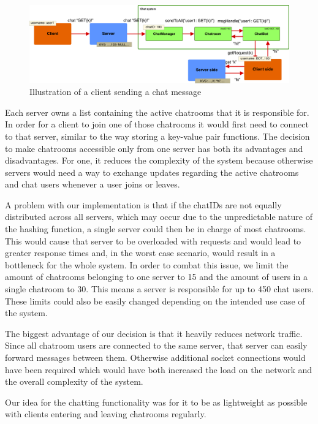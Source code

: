 \begin{figure}[h]
	\centering
	\includegraphics[width=\linewidth]{figures/chatsystem.png}
	\caption{Illustration of a client sending a chat message}
	\label{fig:chatsystem}
\end{figure}

Each server owns a list containing the active chatrooms that it is responsible for. In order for a client to join one of those chatrooms it would first need to connect to that server, similar to the way storing a key-value pair functions. The decision to make chatrooms accessible only from one server has both its advantages and disadvantages. For one, it reduces the complexity of the system because otherwise servers would need a way to exchange updates regarding the active chatrooms and chat users whenever a user joins or leaves.

A problem with our implementation is that if the chatIDs are not equally distributed across all servers, which may occur due to the unpredictable nature of the hashing function, a single server could then be in charge of most chatrooms. This would cause that server to be overloaded with requests and would lead to greater response times and, in the worst case scenario, would result in a bottleneck for the whole system. In order to combat this issue, we limit the amount of chatrooms belonging to one server to 15 and the amount of users in a single chatroom to 30. This means a server is responsible for up to 450 chat users. These limits could also be easily changed depending on the intended use case of the system.

The biggest advantage of our decision is that it heavily reduces network traffic. Since all chatroom users are connected to the same server, that server can easily forward messages between them. Otherwise additional socket connections would have been required which would have both increased the load on the network and the overall complexity of the system.

Our idea for the chatting functionality was for it to be as lightweight as possible with clients entering and leaving chatrooms regularly.